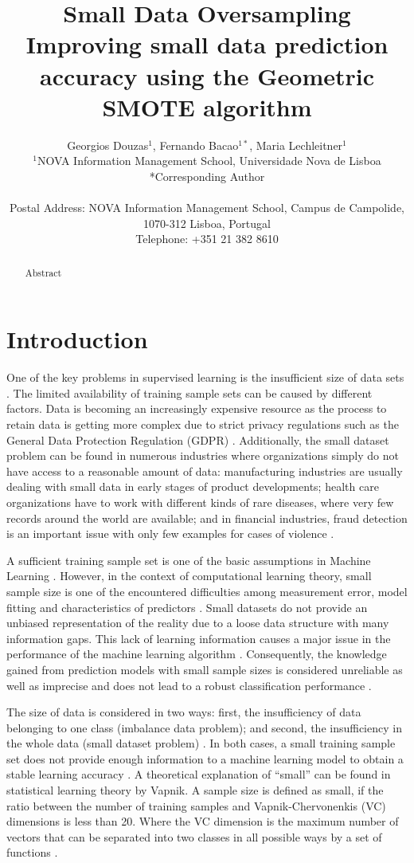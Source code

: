 \documentclass[parskip=full]{scrartcl}
\title{Small Data Oversampling  \\ \LARGE{Improving small data prediction accuracy using the Geometric SMOTE algorithm}}
\author{
	Georgios Douzas\(^{1}\), Fernando Bacao\(^{1*}\), Maria Lechleitner\(^{1}\) 
	\\
	\small{\(^{1}\)NOVA Information Management School, Universidade Nova de Lisboa}
	\\
	\small{*Corresponding Author}
	\\
	\\
	\small{Postal Address: NOVA Information Management School, Campus de Campolide, 1070-312 Lisboa, Portugal}
	\\
	\small{Telephone: +351 21 382 8610}
}
\date{}
\begin{document}
\maketitle

\begin{abstract}
Abstract
\end{abstract}

\section{Introduction}
One of the key problems in supervised learning is the insufficient size of data sets \cite{Niyogi.1998}. The limited availability of training sample sets can be caused by different factors. Data is becoming an increasingly expensive resource \cite{Li.2007} as the process to retain data is getting more complex due to strict privacy regulations such as the General Data Protection Regulation (GDPR) \cite{EuropeanCommission.2019}. Additionally, the small dataset problem can be found in numerous industries where organizations simply do not have access to a reasonable amount of data: manufacturing industries are usually dealing with small data in early stages of product developments; health care organizations have to work with different kinds of rare diseases, where very few records around the world are available; and in financial industries, fraud detection is an important issue with only few examples for cases of violence \cite{AbdulLateh.2017}.

A sufficient training sample set is one of the basic assumptions in Machine Learning \cite{Ivanescu.2006}. However, in the context of computational learning theory, small sample size is one of the encountered difficulties among measurement error, model fitting and characteristics of predictors \cite{AbdulLateh.2017}. Small datasets do not provide an unbiased representation of the reality due to a loose data structure with many information gaps. This lack of learning information causes a major issue in the performance of the machine learning algorithm \cite{Lin.2018}. Consequently, the knowledge gained from prediction models with small sample sizes is considered unreliable as well as imprecise and does not lead to a robust classification performance \cite{AbdulLateh.2017}.

The size of data is considered in two ways: first, the insufficiency of data belonging to one class (imbalance data problem); and second, the insufficiency in the whole data (small dataset problem) \cite{Sezer.2014}. In both cases, a small training sample set does not provide enough information to a machine learning model to obtain a stable learning accuracy \cite{Tsai.2008}. A theoretical explanation of “small” can be found in statistical learning theory by Vapnik. A sample size is defined as small, if the ratio between the number of training samples and Vapnik-Chervonenkis (VC) dimensions is less than 20. Where the VC dimension is the maximum number of vectors that can be separated into two classes in all possible ways by a set of functions \cite{Vapnik.2008}. 
\end{document}
